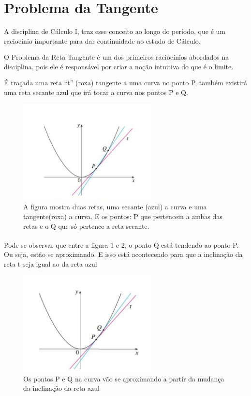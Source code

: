 \documentclass{article}
\begin{document}
\section{Problema da Tangente}
\paragraph{}

A disciplina de Cálculo I, traz esse conceito ao longo do período, que é um raciocínio importante para dar continuidade ao estudo de Cálculo.

O Problema da Reta Tangente é um dos primeiros raciocínios abordados na disciplina, pois ele é responsável por criar a noção intuitiva do que é o limite.\cite{JamesS}

É traçada uma reta “t” (roxa) tangente a uma curva no ponto P, também existirá uma reta secante azul que irá tocar a curva nos pontos P e Q.

\begin{figure}[ht]
    \centering
    \includegraphics[width=7cm]{imagens/tangente_1.jpg}
    \caption{A figura mostra duas retas, uma secante (azul) a curva e uma tangente(roxa) a curva. E os pontos: P que pertencem a ambas das retas e o Q que só pertence a reta secante. \cite{JamesS}}
    \label{figura:tangente1}
\end{figure}

\paragraph{}
Pode-se observar que entre a figura 1 e 2, o ponto Q está tendendo ao ponto P. Ou seja, estão se aproximando. E isso está acontecendo para que a inclinação da reta t seja igual ao da reta azul

\begin{figure}[ht]
    \centering
    \includegraphics[width=7cm]{imagens/tangente_2.jpg}
    \caption{Os pontos P e Q na curva vão se aproximando a partir da mudança da inclinação da reta azul \cite{JamesS}}
    \label{figura:tangente2}
\end{figure}
\end{document}
